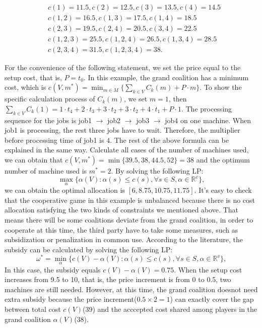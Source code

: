 \[
\begin{aligned}
& c({1}) = 11.5, c({2}) = 12.5, c({3}) = 13.5, c({4}) = 14.5  \\
& c({1,2}) = 16.5, c({1,3}) = 17.5, c({1,4}) = 18.5 \\
& c({2,3}) = 19.5, c({2,4}) = 20.5, c({3,4}) = 22.5 \\
& c({1,2,3}) = 25.5, c({1,2,4}) = 26.5, c({1,3,4}) = 28.5 \\
& c({2,3,4}) = 31.5, c({1,2,3,4}) = 38.
\end{aligned}
\]

For the convenience of the following statement, we set the price equal to the setup cost, that is, $P = t_0$.
In this example, the grand coalition has a minimum cost, which is $c(V,m^*) = \min_{m \in M} \{\sum_{k\in V}{C_k(m)}+ P\cdot m\}.$ To show the specific calculation process of $C_k(m)$, we set $m=1$, then $\sum_{k\in V}{C_k(1)} = 1 \cdot t_4 + 2\cdot t_3 + 3 \cdot t_2 + 3 \cdot t_2 + 4 \cdot t_1 + P \cdot 1.$
The processing sequence for the jobs is job1 $\to$ job2 $\to$ job3 $\to$ job4 on one machine. When job1 is processing, the rest three jobs have to wait. Therefore, the multiplier before processing time of job1 is $4$. The rest of the above formula can be explained in the same way.
Calculate all cases of the number of machines used, we can obtain that
$c(V,m^*) = \min\{39.5, 38, 44.5, 52\} = 38$ and the optimum number of machine used is $m^* = 2$.
By solving the following LP:
\[
  \mathop{\max}_{\alpha}\{\alpha(V): \alpha(s)\leq c(s),\forall s \in S, \alpha\in\mathbb{R}^{v}\},
\]
we can obtain the optimal allocation is $[6, 8.75, 10.75, 11.75]$.
It's easy to check that the cooperative game in this example is unbalanced because there is no cost allocation satisfying the two kinds of constraints we mentioned above. That means there will be some coalitions deviate from the grand coalition, in order to cooperate at this time, the third party have to take some measures, such as subsidization or penalization in common use.
According to the literature, the subsidy can be calculated by solving the following LP:
\[
  {\omega^*}=\mathop{\min}_{\alpha}\{c(V)-\alpha(V): \alpha(s)\leq c(s)
 ,\forall s \in S, \alpha\in\mathbb{R}^{v}\},
\]
In this case, the subsidy equals $c(V) - \alpha(V) = 0.75$.
When the setup cost increases from 9.5 to 10, that is, the price increment is from 0 to 0.5, two machines are still needed. However, at this time, the grand coalition doesnot need extra subsidy because the price increment($0.5\times 2 =1$) can exactly cover the gap between total cost $c(V)$(39) and the acccepted cost shared among players in the grand coalition $\alpha(V)$(38).


